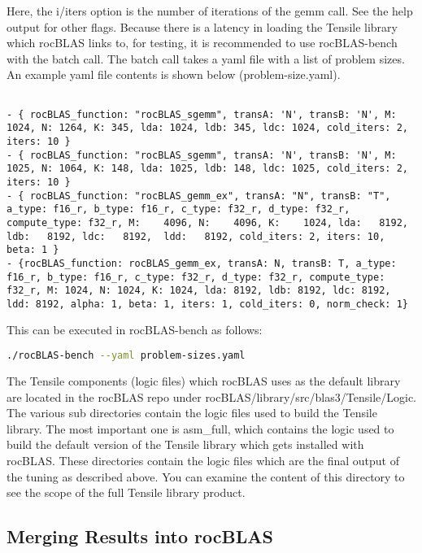 \documentclass[]{article}
\begin{document}
\noindent
Here, the i/iters option is the number of iterations of the gemm call. See the help output for other flags. Because there is a latency in loading the Tensile library which rocBLAS links to, for testing, it is recommended to use rocBLAS-bench with the batch call. The batch call takes a yaml file with a list of problem sizes. An example yaml file contents is shown below (problem-size.yaml).

\begin{verbatim}

- { rocBLAS_function: "rocBLAS_sgemm", transA: 'N', transB: 'N', M: 1024, N: 1264, K: 345, lda: 1024, ldb: 345, ldc: 1024, cold_iters: 2, iters: 10 }
- { rocBLAS_function: "rocBLAS_sgemm", transA: 'N', transB: 'N', M: 1025, N: 1064, K: 148, lda: 1025, ldb: 148, ldc: 1025, cold_iters: 2, iters: 10 }
- { rocBLAS_function: "rocBLAS_gemm_ex", transA: "N", transB: "T", a_type: f16_r, b_type: f16_r, c_type: f32_r, d_type: f32_r, compute_type: f32_r, M:    4096, N:    4096, K:    1024, lda:   8192, ldb:   8192, ldc:   8192,  ldd:   8192, cold_iters: 2, iters: 10, beta: 1 }
- {rocBLAS_function: rocBLAS_gemm_ex, transA: N, transB: T, a_type: f16_r, b_type: f16_r, c_type: f32_r, d_type: f32_r, compute_type: f32_r, M: 1024, N: 1024, K: 1024, lda: 8192, ldb: 8192, ldc: 8192, ldd: 8192, alpha: 1, beta: 1, iters: 1, cold_iters: 0, norm_check: 1}

\end{verbatim}

\noindent
This can be executed in rocBLAS-bench as follows:

\begin{lstlisting}[language=bash]
./rocBLAS-bench --yaml problem-sizes.yaml
\end{lstlisting}

The Tensile components (logic files) which rocBLAS uses as the default library are located in the rocBLAS repo under rocBLAS/library/src/blas3/Tensile/Logic. The various sub directories contain the logic files used to build the Tensile library. The most important one is asm\_full, which contains the logic used to build the default version of the Tensile library which gets installed with rocBLAS. These directories contain the logic files which are the final output of the tuning as described above. You can examine the content of this directory to see the scope of the full Tensile library product.

\subsection{Merging Results into rocBLAS}
\label{sec:merging}
\end{document}
